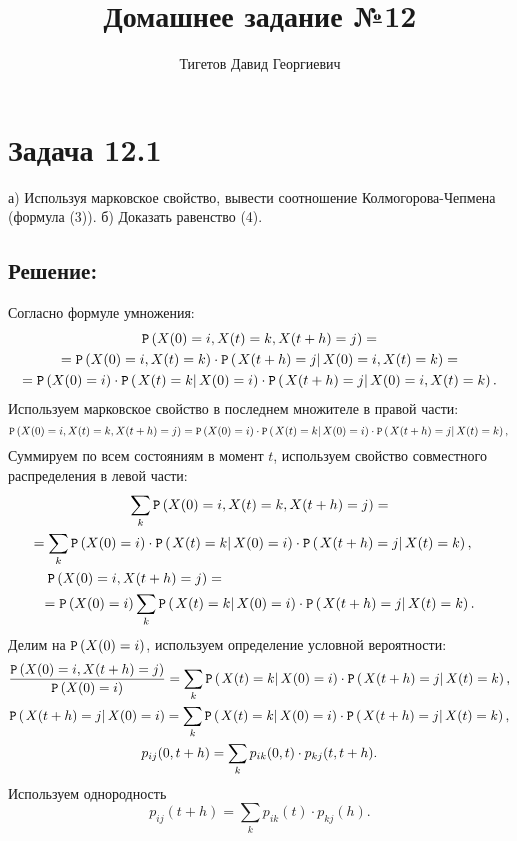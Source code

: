 \documentclass[12pt]{article}
\begin{document}
    \title{Домашнее задание №12}
    \author{Тигетов Давид Георгиевич}
    \date{}
    \maketitle

    \section*{Задача 12.1}
    а) Используя марковское свойство, вывести соотношение Колмогорова-Чепмена (формула (3)).
    б) Доказать равенство (4).

    \subsection*{Решение:}
    Согласно формуле умножения:
    \begin{multline*}
        \mathtt{P} \left ( X(0) = i, X(t) = k, X(t+h) = j \right ) = \\
        = \mathtt{P} \left ( X(0) = i, X(t) = k \right ) \cdot \mathtt{P} \left ( \left . {X(t+h) = j} \right | {X(0) = i, X(t) = k} \right ) = \\
        = \mathtt{P} \left ( X(0) = i \right ) \cdot \mathtt{P} \left ( \left . {X(t) = k} \right | {X(0) = i} \right ) \cdot \mathtt{P} \left ( \left . {X(t+h) = j} \right | {X(0) = i, X(t) = k} \right ).
    \end{multline*}
    Используем марковское свойство в последнем множителе в правой части:
    \[
        \mathtt{P} \left ( X(0) = i, X(t) = k, X(t+h) = j \right ) = \mathtt{P} \left ( X(0) = i \right ) \cdot \mathtt{P} \left ( \left . {X(t) = k} \right | {X(0) = i} \right ) \cdot \mathtt{P} \left ( \left . {X(t+h) = j} \right | {X(t) = k} \right ) , \\
    \]
    Суммируем по всем состояниям в момент $t$, используем свойство совместного распределения в левой части:
    \begin{multline*}
        \sum_k \probability{X(0) = i, X(t) = k, X(t+h) = j} = \\
        \shoveright{= \sum_k \probability{X(0) = i} \cdot \conditionalprobability{X(t) = k}{X(0) = i} \cdot \conditionalprobability{X(t+h) = j}{X(t) = k},} \\
        \shoveleft{\probability{X(0) = i, X(t+h) = j} =} \\
        = \probability{X(0) = i} \sum_k \conditionalprobability{X(t) = k}{X(0) = i} \cdot \conditionalprobability{X(t+h) = j}{X(t) = k}.
    \end{multline*}
    Делим на $\mathtt{P} \left ( X(0) = i \right )$, используем определение условной вероятности:
    \begin{gather*}
        \frac{\mathtt{P} \left ( X(0) = i, X(t+h) = j \right )}{\mathtt{P} \left ( X(0) = i \right )} = \sum_k \mathtt{P} \left ( \left . {X(t) = k} \right | {X(0) = i} \right ) \cdot \mathtt{P} \left ( \left . {X(t+h) = j} \right | {X(t) = k} \right ), \\
        \mathtt{P} \left ( \left . {X(t+h) = j} \right | {X(0) = i} \right ) = \sum_k \mathtt{P} \left ( \left . {X(t) = k} \right | {X(0) = i} \right ) \cdot \mathtt{P} \left ( \left . {X(t+h) = j} \right | {X(t) = k} \right ), \\
        p_{ij}(0, t+h) = \sum_k p_{ik}(0, t) \cdot p_{kj}(t, t+h) .
    \end{gather*}
    Используем однородность
    \[
        p_{ij}(t+h) = \sum_k p_{ik}(t) \cdot p_{kj}(h) .
    \]
\end{document}
